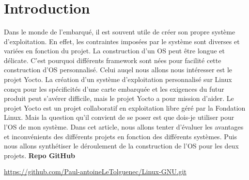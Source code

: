 \section{Introduction}
\paragraph{}
Dans le monde de l'embarqué, il est souvent utile de créer son propre système d'exploitation. En effet, les contraintes imposées par le système sont diverses et variées en fonction du projet.
La construction d'un OS peut être longue et délicate. C'est pourquoi différents framework sont nées pour facilité cette construction d'OS personnalisé. Celui auqel nous allons nous intéresser est le projet Yocto.
La création d'un système d'exploitation personnalisé sur Linux conçu pour les spécificités d'une carte embarquée et les exigences du futur produit peut s'avérer difficile, mais le projet Yocto a pour mission d'aider. 
Le projet Yocto est un projet collaboratif en exploitation libre géré par la Fondation Linux. Mais la question qu'il convient de se poser est que dois-je utiliser pour l'OS de mon système.
Dans cet article, nous allons tenter d'évaluer les avantages et inconvénients des différents projets en fonction des différents systèmes.
Puis nous allons synthétiser le déroulement de la construction de l'OS pour les deux projets.
\textbf{Repo GitHub}

\url{https://github.com/Paul-antoineLeTolguenec/Linux-GNU.git}

\newpage
